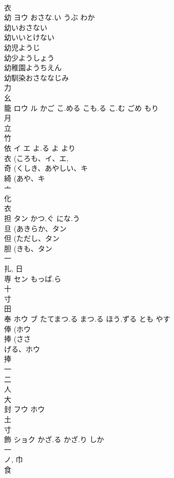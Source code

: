 \documentclass[8pt]{extreport}
\begin{document}
\begin{CJK}{UTF8}{min}
\\	衣 
\\	幼	ヨウ	おさな.い うぶ わか	
\\	幼いおさない
\\	幼いいとけない
\\	幼児ようじ
\\	幼少ようしょう
\\	幼稚園ようちえん
\\	幼馴染おさななじみ
\\	力 
\\	幺 
\\	籠	ロウ ル	かご こ.める こも.る こ.む ごめ もり	
\\	月 
\\	立 
\\	竹 
\\	依	イ エ	よ.る よ より	
\\	衣 (ころも、イ、エ, 
\\	奇 (くしき、あやしい、キ 
\\	綺 (あや、キ 
\\	亠 
\\	化 
\\	衣 
\\	担	タン	かつ.ぐ にな.う	
\\	旦 (あきらか、タン 
\\	但 (ただし、タン 
\\	胆 (きも、タン 
\\	一 
\\	扎, 日 
\\	専	セン	もっぱ.ら	
\\	十 
\\	寸 
\\	田 
\\	奉	ホウ ブ	たてまつ.る まつ.る ほう.ずる とも やす	
\\	俸 (ホウ 
\\	捧 (ささ
\\	げる、ホウ 
\\	捧 
\\	一 
\\	二 
\\	人 
\\	大 
\\	封	フウ ホウ		
\\	土 
\\	寸 
\\	飾	ショク	かざ.る かざ.り しか	
\\	一 
\\	ノ, 巾 
\\	食 

\end{CJK}
\end{document}
